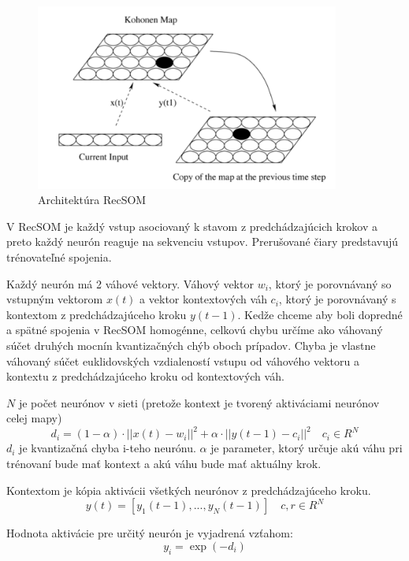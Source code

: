 \begin{figure}[H]
	\centering
	\includegraphics[width=10cm]{assets/rec_som}
	\caption{Architektúra RecSOM \protect\cite{Voegtlin:2002:RSM:776097.776102}}
\end{figure}

V RecSOM je každý vstup asociovaný k stavom z predchádzajúcich krokov a preto každý 
neurón reaguje na sekvenciu vstupov.
Prerušované čiary predstavujú trénovateľné spojenia.

Každý neurón má 2 váhové vektory. Váhový vektor $w_i$, ktorý je porovnávaný so
vstupným vektorom $x(t)$ a vektor kontextových váh $c_i$, ktorý je porovnávaný s kontextom z predchádzajúceho
kroku $y(t-1)$. Kedže chceme aby boli dopredné a spätné spojenia v RecSOM homogénne, 
celkovú chybu určíme ako váhovaný súčet druhých mocnín kvantizačných chýb oboch prípadov. Chyba je vlastne váhovaný súčet euklidovských vzdialeností
vstupu od váhového vektoru a kontextu z predchádzajúceho kroku od kontextových váh. 

$N$ je počet neurónov v sieti (pretože kontext je tvorený aktiváciami neurónov celej mapy)
\begin{equation} \label{eq:rec_som_distance}
	d_i = (1 - \alpha) \cdot ||x(t) - w_i||^{2} + \alpha \cdot ||y(t-1) - c_i||^{2} \quad c_{i} \in R^{N}
\end{equation}
$d_i$ je kvantizačná chyba i-teho neurónu.
$\alpha$ je parameter, ktorý určuje akú váhu pri trénovaní bude mať kontext a akú váhu bude mať
aktuálny krok.

Kontextom je kópia aktivácii všetkých neurónov z predchádzajúceho kroku.
\begin{equation}
	y(t) = [y_1(t-1), ..., y_{N}(t-1)]  \quad c, r \in R^{N}
\end{equation}

Hodnota aktivácie pre určitý neurón je vyjadrená vzťahom:
\begin{equation}
	y_i = \exp(-d_i)
\end{equation}

